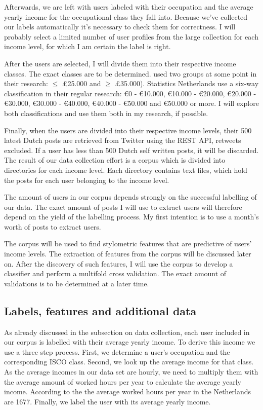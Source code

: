 \documentclass[11pt, a4paper]{article}
\begin{document}
Afterwards, we are left with users labeled with their occupation and the average yearly income for the occupational class they fall into. Because we've collected our labels automatically it's necessary to check them for correctness. I will probably select a limited number of user profiles from the large collection for each income level, for which I am certain the label is right. 

After the users are selected, I will divide them into their respective income classes. The exact classes are to be determined. \citet{flekova} used two groups at some point in their research: $\leq$ \pounds 25.000 and $\geq$ \pounds 35.000). Statistics Netherlands use a six-way classification in their regular research: \euro 0 - \euro 10.000, \euro 10.000 - \euro 20.000, \euro 20.000 - \euro 30.000, \euro 30.000 - \euro 40.000, \euro 40.000 - \euro 50.000 and \euro 50.000 or more. I will explore both classifications and use them both in my research, if possible.

Finally, when the users are divided into their respective income levels, their 500 latest Dutch posts are retrieved from Twitter using the REST API, retweets excluded. If a user has less than 500 Dutch self written posts, it will be discarded. The result of our data collection effort is a corpus which is divided into directories for each income level. Each directory contains text files, which hold the posts for each user belonging to the income level. 

The amount of users in our corpus depends strongly on the successful labelling of our data. The exact amount of posts I will use to extract users will therefore depend on the yield of the labelling process. My first intention is to use a month's worth of posts to extract users.

The corpus will be used to find stylometric features that are predictive of users' income levels. The extraction of features from the corpus will be discussed later on. After the discovery of such features, I will use the corpus to develop a classifier and perform a multifold cross validation. The exact amount of validations is to be determined at a later time.

\subsection{Labels, features and additional data}
As already discussed in the subsection on data collection, each user included in our corpus is labelled with their average yearly income. To derive this income we use a three step process. First, we determine a user's occupation and the corresponding ISCO class. Second, we look up the average income for that class. As the average incomes in our data set are hourly, we need to multiply them with the average amount of worked hours per year to calculate the average yearly income. According to the \citet{hours} the average worked hours per year in the Netherlands are 1677. Finally, we label the user with its average yearly income.
\end{document}

